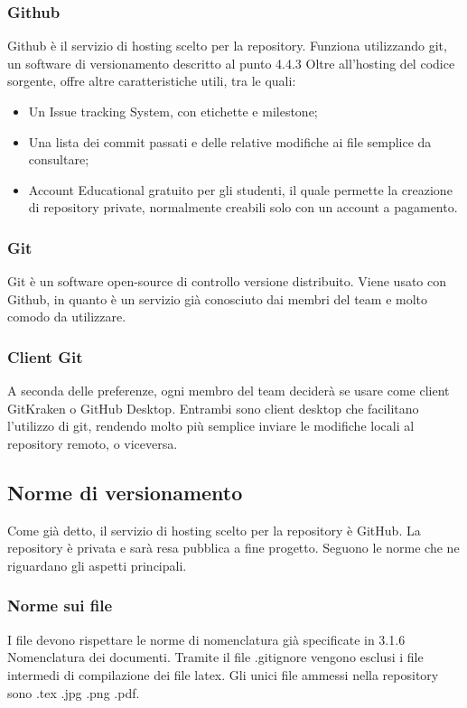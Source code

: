 \subsubsection{Github}
Github è il servizio di hosting scelto per la repository. Funziona utilizzando git, un software di versionamento descritto al punto 4.4.3 Oltre all'hosting del codice sorgente, offre altre caratteristiche utili, tra le quali:
\begin{itemize}  
\item Un Issue tracking System, con etichette e milestone;
\item Una lista dei commit passati e delle relative modifiche ai file semplice da consultare;
\item Account Educational gratuito per gli studenti, il quale permette la creazione di repository private, normalmente creabili solo con un account a pagamento.
\end{itemize}

\subsubsection{Git}
Git è un software open-source di controllo versione distribuito. 
Viene usato con Github, in quanto è un servizio già conosciuto dai membri del team e molto comodo da utilizzare.

\subsubsection{Client Git}
A seconda delle preferenze, ogni membro del team deciderà se usare come client GitKraken o GitHub Desktop. Entrambi sono client desktop che facilitano l'utilizzo di git, rendendo molto più semplice inviare le modifiche locali al repository remoto, o viceversa.

\subsection{Norme di versionamento}
Come già detto, il servizio di hosting scelto per la repository è GitHub.
La repository è privata e sarà resa pubblica a fine progetto. Seguono le norme che ne riguardano gli aspetti principali.

\subsubsection{Norme sui file}
I file devono rispettare le norme di nomenclatura già specificate in 3.1.6 Nomenclatura dei documenti.
Tramite il file .gitignore vengono esclusi i file intermedi di compilazione dei file latex.
Gli unici file ammessi nella repository sono .tex .jpg .png .pdf.

